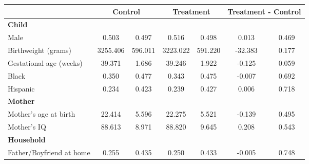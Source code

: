\begin{tabular}{lcccccc}
\toprule
& \multicolumn{2}{c}{Control} & \multicolumn{2}{c}{Treatment} & \multicolumn{2}{c}{Treatment - Control} \\
\midrule
\textbf{Child} & & & & & & \\
\quad\quad Male & 0.503 & 0.497 & 0.516 & 0.498 & 0.013 & 0.469 \\
\quad\quad Birthweight (grams) & 3255.406 & 596.011 & 3223.022 & 591.220 & -32.383 & 0.177 \\
\quad\quad Gestational age (weeks) & 39.371 & 1.686 & 39.246 & 1.922 & -0.125 & 0.059 \\
\quad\quad Black & 0.350 & 0.477 & 0.343 & 0.475 & -0.007 & 0.692 \\
\quad\quad Hispanic & 0.234 & 0.423 & 0.239 & 0.427 & 0.006 & 0.718 \\
\textbf{Mother} & & & & & & \\
\quad\quad Mother's age at birth & 22.414 & 5.596 & 22.275 & 5.521 & -0.139 & 0.495 \\
\quad\quad Mother's IQ & 88.613 & 8.971 & 88.820 & 9.645 & 0.208 & 0.543 \\
\textbf{Household} & & & & & & \\
\quad\quad Father/Boyfriend at home & 0.255 & 0.435 & 0.250 & 0.433 & -0.005 & 0.748 \\
\bottomrule
\end{tabular}
